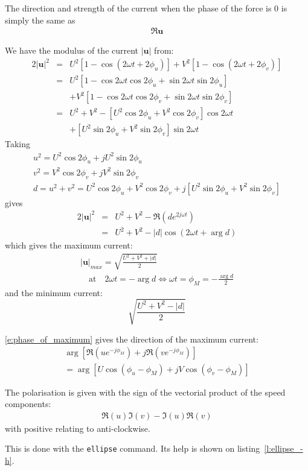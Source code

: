 \documentclass[11pt]{article} %
\providecommand{\seq}[1]{\begin{subequations}#1\end{subequations}}
\providecommand{\eqc}[1]{\begin{gather}#1\end{gather}}%
\providecommand{\seqc}[1]{\seq{\eqc{#1}}}
\providecommand{\abs}[1]{\left| #1 \right|}
\providecommand{\sqb}[1]{\left[#1\right]}%
\providecommand{\rdb}[1]{\left(#1\right)}%
\providecommand{\m}[1]{\mathbf{#1}}
\providecommand{\spacedtext}[1]{\quad\text{#1}\quad}
\providecommand{\code}[1]{\hbox{\lstinline|#1|}}
\providecommand{\cmdhelp}[1]{\end{multicols}\begin{multicols}{2}}
\newcommand{\lref}[1]{listing~\ref{#1}}
\begin{document}
\begin{multicols}{2}
The direction and strength of the current when the phase of the force is 0 is simply the same as
\begin{gather}
\Re{\m{u}} \label{e:direction0}
\end{gather}

\iffalse
Reminder:
\begin{gather*}
  \cos(a+b)=\cos a\cos b-\sin a\sin b\\
  \sin(a+b)=\sin a\cos b+\cos a\sin b\\
  2\cos a\cos b=\cos(a+b)+\cos(a-b)\\
  2\sin a\sin b=-\cos(a+b)+\cos(a-b)\\
  2\sin a\cos b=\sin(a+b)+\sin(a-b)
\end{gather*}
\fi

We have the modulus of the current $\abs{\m{u}}$ from:
\begin{eqnarray*}
2\abs{\m{u}}^2
  &=& U^2\sqb{1-\cos\rdb{2\omega t+2\phi_u}}+V^2\sqb{1-\cos\rdb{2\omega t+2\phi_v}} \\
&=&U^2\sqb{1-\cos2\omega t\cos2\phi_u+\sin 2\omega t \sin 2\phi_u} \nonumber\\
  && +V^2\sqb{1-\cos2\omega t\cos2\phi_v+\sin 2\omega t \sin 2\phi_v} \\
&=&U^2+V^2 - \sqb{U^2\cos2\phi_u+V^2\cos2\phi_v}\cos2\omega t \nonumber\\
 && +\sqb{U^2\sin2\phi_u+V^2\sin2\phi_v}\sin 2\omega t
\end{eqnarray*}
Taking
\begin{gather*}
u^2 = U^2\cos2\phi_u+jU^2\sin2\phi_u\\
v^2 = V^2\cos2\phi_v+jV^2\sin2\phi_v\\
d = u^2+v^2 = U^2\cos2\phi_u+V^2\cos2\phi_v+j\sqb{U^2\sin2\phi_u+V^2\sin2\phi_v}
\end{gather*}
gives
\begin{eqnarray*}
2\abs{\m{u}}^2 &=& U^2+V^2 - \Re \rdb{d e^{2j\omega t}} \\
   &=& U^2+V^2 - \abs d\cos\rdb{2\omega t+\arg d}
\end{eqnarray*}
which gives the maximum current:
\seqc{
  \abs{\m{u}}_{max} = \sqrt{\frac{U^2+V^2+\abs d}{2}} \\
  \spacedtext{at}
    2\omega t=-\arg d
    \Leftrightarrow \omega t=\phi_{M}=-\frac{\arg d}{2} \label{e:phase_of_maximum}
  }
and the minimum current:
  $$\sqrt{\frac{U^2+V^2-\abs d}{2}}$$

\eqref{e:phase_of_maximum} gives the direction of the maximum current:
\seqc{
\arg\sqb{\Re\rdb{u e^{-j\phi_M}}+j\Re\rdb{v e^{-j\phi_M}}} \\
=\arg\sqb{U\cos\rdb{\phi_u-\phi_M}+jV\cos\rdb{\phi_v-\phi_M}}
  }

The polarisation is given with the sign of the vectorial product of the speed components:
\seqc{
  \Re \rdb u \Im \rdb v - \Im \rdb u \Re \rdb v
  }
with positive relating to anti-clockwise.

This is done with the \code{ellipse} command.
Its help is shown on \lref{l:ellipse_-h}.
\cmdhelp{ellipse}



\end{multicols}
\end{document}

